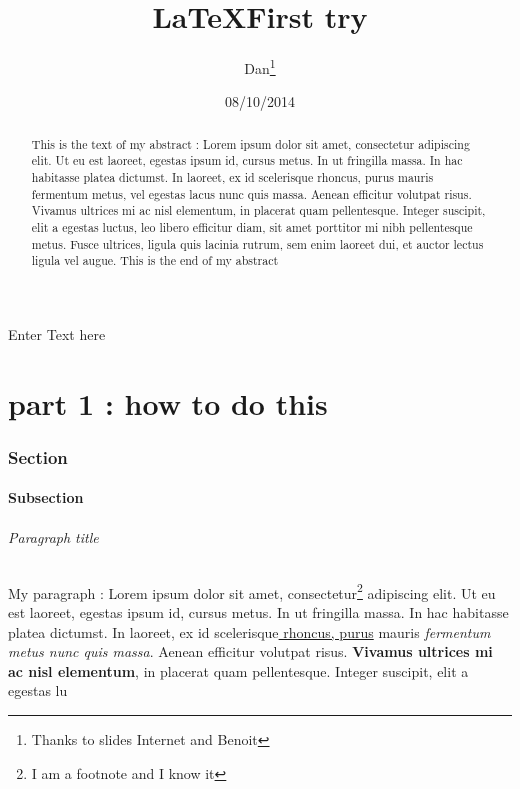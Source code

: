 \documentclass[12pt]{article}
\title{\LaTeX First try}
\author{Dan\thanks{Thanks to slides Internet and Benoit}}
\date{08/10/2014}
\begin{document}
\maketitle
\begin{abstract}
This is the text of my abstract :
Lorem ipsum dolor sit amet, consectetur adipiscing elit. Ut eu est laoreet, egestas ipsum id, cursus metus. In ut fringilla massa. In hac habitasse platea dictumst. In laoreet, ex id scelerisque rhoncus, purus mauris fermentum metus, vel egestas lacus nunc quis massa. Aenean efficitur volutpat risus. Vivamus ultrices mi ac nisl elementum, in placerat quam pellentesque. Integer suscipit, elit a egestas luctus, leo libero efficitur diam, sit amet porttitor mi nibh pellentesque metus. Fusce ultrices, ligula quis lacinia rutrum, sem enim laoreet dui, et auctor lectus ligula vel augue.\newline
This is the end of my abstract
\end{abstract}

Enter Text here

\newpage
\tableofcontents
\newpage

\part{part 1 : how to do this}
\section{Section}
\subsection{Subsection}
\paragraph{Paragraph title}

My paragraph : Lorem ipsum dolor sit amet, consectetur\footnote{I am a footnote and I know it} adipiscing elit. Ut eu est laoreet, egestas ipsum id, cursus metus. In ut fringilla massa. In hac habitasse platea dictumst. In laoreet, ex id scelerisque\underline{ rhoncus, purus} mauris \textit{fermentum metus nunc quis massa}. Aenean efficitur volutpat risus. \textbf{Vivamus ultrices mi ac nisl elementum}, in placerat quam pellentesque. Integer suscipit, elit a egestas lu
\end{document}
